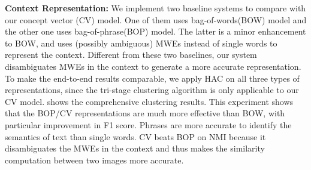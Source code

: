 \textbf{Context Representation:}
We implement two baseline systems to compare with our concept vector (CV) model.
One of them uses bag-of-words(BOW) model and the other one uses
bag-of-phrase(BOP) model.
The latter is a minor enhancement to BOW, and uses
(possibly ambiguous) MWEs instead of single words to represent the context.
Different from these two baselines, our system
disambiguates MWEs
in the context to generate a more accurate representation.
To make the end-to-end results comparable,
we apply HAC on all three types of representations,
since the tri-stage clustering algorithm is only applicable to our CV model.
 shows the comprehensive clustering results.
This experiment shows that the BOP/CV representations are much more
effective than BOW, with particular improvement in F1 score.
Phrases are more accurate to identify the semantics of text than single words.
CV beats BOP on NMI because it disambiguates the MWEs in
the context and thus makes the similarity computation between two images
more accurate.



